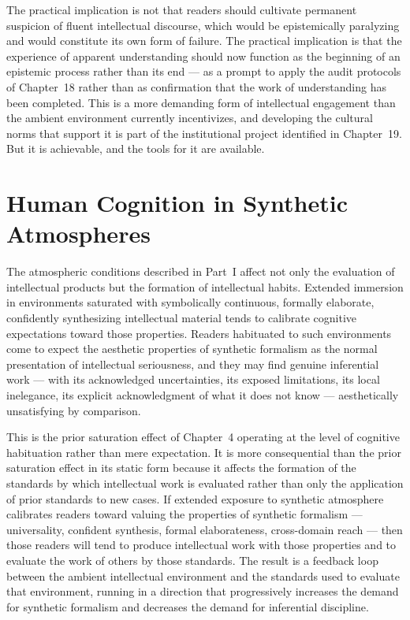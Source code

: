 \documentclass[12pt, openright, twoside]{book}
\begin{document}
The practical implication is not that readers should cultivate permanent
suspicion of fluent intellectual discourse, which would be epistemically
paralyzing and would constitute its own form of failure. The practical
implication is that the experience of apparent understanding should now
function as the beginning of an epistemic process rather than its end ---
as a prompt to apply the audit protocols of Chapter~18 rather than as
confirmation that the work of understanding has been completed. This is
a more demanding form of intellectual engagement than the ambient
environment currently incentivizes, and developing the cultural norms
that support it is part of the institutional project identified in
Chapter~19. But it is achievable, and the tools for it are available.

\section{Human Cognition in Synthetic Atmospheres}

The atmospheric conditions described in Part~I affect not only the
evaluation of intellectual products but the formation of intellectual
habits. Extended immersion in environments saturated with symbolically
continuous, formally elaborate, confidently synthesizing intellectual
material tends to calibrate cognitive expectations toward those properties.
Readers habituated to such environments come to expect the aesthetic
properties of synthetic formalism as the normal presentation of intellectual
seriousness, and they may find genuine inferential work --- with its
acknowledged uncertainties, its exposed limitations, its local inelegance,
its explicit acknowledgment of what it does not know --- aesthetically
unsatisfying by comparison.

This is the prior saturation effect of Chapter~4 operating at the level
of cognitive habituation rather than mere expectation. It is more
consequential than the prior saturation effect in its static form because
it affects the formation of the standards by which intellectual work
is evaluated rather than only the application of prior standards to
new cases. If extended exposure to synthetic atmosphere calibrates readers
toward valuing the properties of synthetic formalism --- universality,
confident synthesis, formal elaborateness, cross-domain reach --- then
those readers will tend to produce intellectual work with those properties
and to evaluate the work of others by those standards. The result is
a feedback loop between the ambient intellectual environment and the
standards used to evaluate that environment, running in a direction that
progressively increases the demand for synthetic formalism and decreases
the demand for inferential discipline.
\end{document}
